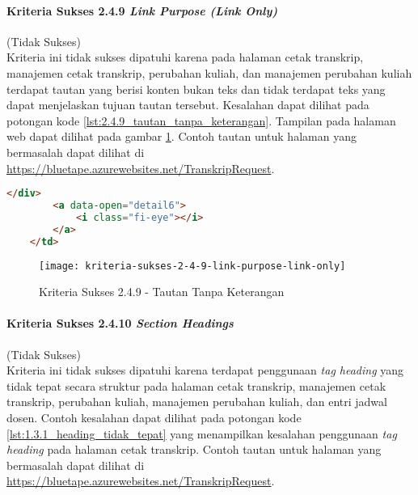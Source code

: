 \paragraph{Kriteria Sukses 2.4.9 \textit{Link Purpose (Link Only)}}
\label{par:kepatuhan_bluetape_kriteria_sukses_2.4.9}
(Tidak Sukses)\\

Kriteria ini tidak sukses dipatuhi karena pada halaman cetak transkrip, manajemen cetak transkrip, perubahan kuliah, dan manajemen perubahan kuliah terdapat tautan yang berisi konten bukan teks dan tidak terdapat teks yang dapat menjelaskan tujuan tautan tersebut. Kesalahan dapat dilihat pada potongan kode \ref{lst:2.4.9_tautan_tanpa_keterangan}. Tampilan pada halaman web dapat dilihat pada gambar \ref{fig:2.4.9_link_purpose_link_only}. Contoh tautan untuk halaman yang bermasalah dapat dilihat di \url{https://bluetape.azurewebsites.net/TranskripRequest}.

\begin{lstlisting}[frame=single, label={lst:2.4.9_tautan_tanpa_keterangan}, language=HTML, caption=Kriteria Sukses 2.4.9 - Tautan Tanpa Keterangan]
        </div>
        <a data-open="detail6">
            <i class="fi-eye"></i>
        </a>
    </td>
\end{lstlisting}

\begin{figure}[H]
    \centering  
    \texttt{[image: kriteria-sukses-2-4-9-link-purpose-link-only]}  
    \caption[Kriteria Sukses 2.4.9 - Tautan Tanpa Keterangan]{Kriteria Sukses 2.4.9 - Tautan Tanpa Keterangan}
    \label{fig:2.4.9_link_purpose_link_only}  
\end{figure} 

\paragraph{Kriteria Sukses 2.4.10 \textit{Section Headings}}
\label{par:kepatuhan_bluetape_kriteria_sukses_2.4.10}
(Tidak Sukses)\\

Kriteria ini tidak sukses dipatuhi karena terdapat penggunaan \textit{tag heading} yang tidak tepat secara struktur pada halaman cetak transkrip, manajemen cetak transkrip, perubahan kuliah, manajemen perubahan kuliah, dan entri jadwal dosen. Contoh kesalahan dapat dilihat pada potongan kode \ref{lst:1.3.1_heading_tidak_tepat} yang menampilkan kesalahan penggunaan \textit{tag heading} pada halaman cetak transkrip. Contoh tautan untuk halaman yang bermasalah dapat dilihat di \url{https://bluetape.azurewebsites.net/TranskripRequest}.

